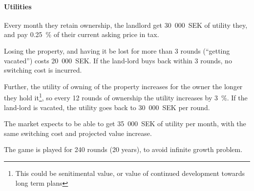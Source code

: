 \documentclass{article}
\begin{document}
\paragraph{Utilities}
Every month they retain ownership, the landlord get 30~000~SEK of utility they, and pay
0.25~\% of their current asking price in tax.

Losing the property, and having it be lost for more than 3 rounds (``getting
vacated'') costs 20~000~SEK. If the land-lord buys back within 3 rounds, no
switching cost is incurred.

Further, the utility of owning of the property increases for the owner
the longer they hold it\footnote{This could be senitimental value, or value of
  continued development towards long term plans}, so every 12 rounds of
ownership the utility increases by 3~\%. If the land-lord is vacated, the
utility goes back to 30~000~SEK per round.

The market expects to be able to get 35~000~SEK of utility per month, with the
same switching cost and projected value increase.

The game is played for 240 rounds (20 years), to avoid infinite growth problem.
\end{document}
